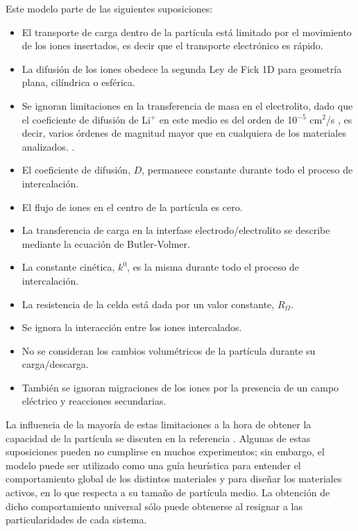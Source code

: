 Este modelo parte de las siguientes suposiciones:
\begin{itemize}
    \item El transporte de carga dentro de la partícula está limitado por el
        movimiento de los iones insertados, es decir que el transporte electrónico
        es rápido.
    \item La difusión de los iones obedece la segunda Ley de Fick 1D para 
        geometría plana, cilíndrica o esférica.
    \item Se ignoran limitaciones en la transferencia de masa en el electrolito, dado que el coeficiente de difusión de Li$^+$ en este medio es del orden de 10$^{-5}$ cm$^2$/s \todo{\cite{}}, es decir, varios órdenes de magnitud mayor que en cualquiera de los materiales analizados. .
    \item El coeficiente de difusión, $D$, permanece constante durante todo el 
        proceso de intercalación.
    \item El flujo de iones en el centro de la partícula es cero.
    \item La transferencia de carga en la interfase electrodo/electrolito se 
        describe mediante la ecuación de Butler-Volmer.
    \item La constante cinética, $k^0$, es la misma durante todo el proceso de 
        intercalación.
    \item La resistencia de la celda está dada por un valor constante, 
        $R_{\Omega}$.
    \item Se ignora la interacción entre los iones intercalados.
    \item No se consideran los cambios volumétricos de la partícula durante su 
        carga/descarga.
    \item También se ignoran migraciones de los iones por la presencia de un 
        campo eléctrico y reacciones secundarias.
\end{itemize}
La influencia de la mayoría de estas limitaciones a la hora de obtener la 
capacidad de la partícula se discuten en la referencia \cite{gavilan2023}. Algunas
de estas suposiciones pueden no cumplirse en muchos experimentos; sin embargo, el 
modelo puede ser utilizado como una guía heurística para entender el 
comportamiento global de los distintos materiales y para diseñar los materiales
activos, en lo que respecta a su tamaño de partícula medio. La obtención de dicho
comportamiento universal sólo puede obtenerse al resignar a las particularidades
de cada sistema. 

